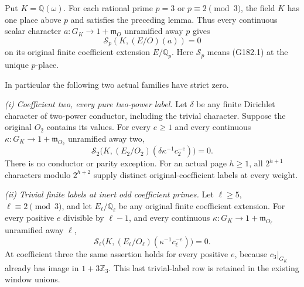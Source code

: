 \begin{theorem}
\label{AC-G182}
Put $K=\mathbb Q(\omega)$.
For each rational prime $p=3$ or $p\equiv2\pmod3$, the field $K$ has one place above
$p$ and satisfies the preceding lemma.  Thus every continuous scalar
character $a:G_K\to1+\mathfrak m_O$ unramified away $p$ gives
\[
                       \mathcal S_p(K,(E/O)(a))=0
 \tag{G182.8}
\]
on its original finite coefficient extension $E/\mathbb Q_p$.
Here $\mathcal S_p$ means (G182.1) at the unique $p$-place.

In particular the following two actual families have strict zero.

\emph{(i) Coefficient two, every pure two-power label.}
Let $\delta$ be any finite Dirichlet character of two-power conductor,
including the trivial character.  Suppose the original $O_2$ contains
its values.  For every $e\geq1$ and every continuous
$\kappa:G_K\to1+\mathfrak m_{O_2}$ unramified away two,
\[
 \mathcal S_2\bigl(K,(E_2/O_2)
                    (\delta\kappa^{-1}c_2^{-e})\bigr)=0.
 \tag{G182.9}
\]
There is no conductor or parity exception.
For an actual page $h\geq1$, all $2^{h+1}$ characters modulo
$2^{h+2}$ supply distinct original-coefficient labels at every weight.

\emph{(ii) Trivial finite labels at inert odd coefficient primes.}
Let $\ell\geq5$, $\ell\equiv2\pmod3$, and let $E_\ell/\mathbb Q_\ell$
be any original finite coefficient extension.
For every positive $e$ divisible by $\ell-1$, and every continuous
$\kappa:G_K\to1+\mathfrak m_{O_\ell}$ unramified away $\ell$,
\[
 \mathcal S_\ell\bigl(K,(E_\ell/O_\ell)
                         (\kappa^{-1}c_\ell^{-e})\bigr)=0.
 \tag{G182.10}
\]
At coefficient three the same assertion holds for every positive $e$,
because $c_3|_{G_K}$ already has image in $1+3\mathbb Z_3$.
This last trivial-label row is retained in the existing window unions.
\end{theorem}

